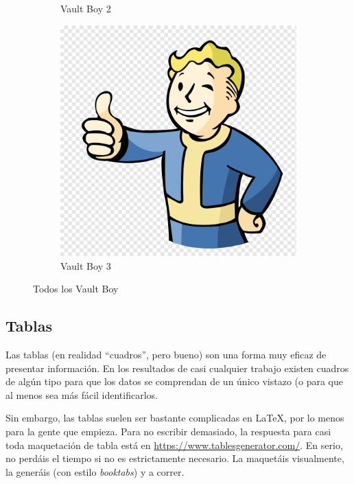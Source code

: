 \documentclass[%
    school=etsisi,%
    degree=61TI,%
]{upm-report}
\begin{document}
\begin{figure}
\begin{subfigure}{.3\textwidth}
		\caption{Vault Boy 2}
	\end{subfigure}
    \hfill
	\begin{subfigure}{.3\textwidth}
		\includegraphics[width=\textwidth]{figures/vault-boy.png}
		\caption{Vault Boy 3}
	\end{subfigure}
	\caption{\label{fig:subfigures}Todos los Vault Boy}
\end{figure}

\subsection{Tablas}

Las tablas (en realidad \enquote{cuadros}, pero bueno) son una forma muy eficaz de presentar información. En los resultados de casi cualquier trabajo existen cuadros de algún tipo para que los datos se comprendan de un único vistazo (o para que al menos sea más fácil identificarlos.

Sin embargo, las tablas suelen ser bastante complicadas en \LaTeX, por lo menos para la gente que empieza. Para no escribir demasiado, la respuesta para casi toda maquetación de tabla está en \href{https://www.tablesgenerator.com/}{https://www.tablesgenerator.com/}. En serio, no perdáis el tiempo si no es estrictamente necesario. La maquetáis visualmente, la generáis (con estilo \textit{booktabs}) y a correr.
\end{document}
